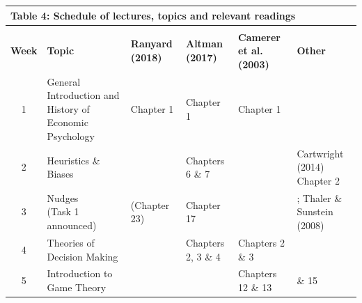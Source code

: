 \documentclass[
  x11names]{article}
\begin{document}
\begin{table}[h!]
  \begin{center}
    \begin{tabular}{| c | >{\arraybackslash}m{5cm} | >{\centering\arraybackslash}m{1.75cm} | >{\centering\arraybackslash}m{1.75cm} | >{\centering\arraybackslash}m{1.75cm} | >{\centering\arraybackslash}m{3cm} | }
    \multicolumn{6}{l}{\textbf{Table 4:} Schedule of lectures, topics and relevant readings} \\
    \hline
    & & \multicolumn{4}{c|}{\textbf{Readings}} \\ \hline
    \textbf{Week} & \textbf{Topic} &                      \textbf{Ranyard (2018)} & \textbf{Altman (2017)} & \textbf{Camerer et al. (2003)} & \textbf{Other}  \\ \hline
      1   & General Introduction and History of Economic Psychology & Chapter 1    & Chapter 1          & Chapter 1           &  \href{https://learn.ul.ie//content/enforced/46950-PS4168_SEM1_2024_5/1.Resources/Cartwright_2014_Chapter1.pdf}{\color{blue}{Cartwright (2014) Chapter 1}\color{black}} \\ \hline
      2   & Heuristics \& Biases                                    & \href{https://learn.ul.ie//content/enforced/46950-PS4168_SEM1_2024_5/1.Resources/Ranyard_2018_Chapter2.pdf}{\color{blue}{Chapter 2}\color{black}}    & Chapters 6 \& 7    &                     & Cartwright (2014) Chapter 2     \\ \hline
      3   & \makecell[l]{Nudges \\ (Task 1 announced) }           & (Chapter 23) & Chapter 17         &                     & \href{https://learn.ul.ie//content/enforced/46950-PS4168_SEM1_2024_5/1.Resources/Frantz_2016_Chapter8.pdf}{\color{blue}{Frantz et al., (2016) Chapter 8}\color{black}}; Thaler \& Sunstein (2008) \\ \hline
      4   & Theories of Decision Making                  & \href{https://learn.ul.ie//content/enforced/46950-PS4168_SEM1_2024_5/1.Resources/Ranyard_2018_Chapter2.pdf}{\color{blue}{Chapter 2}\color{black}}    & Chapters 2, 3 \& 4 & Chapters 2 \& 3     &                                 \\ \hline
      5   & Introduction to Game Theory            &              & \href{https://learn.ul.ie//content/enforced/46950-PS4168_SEM1_2024_5/1.Resources/Altman_2017_Chapter32.pdf}{\color{blue}{Chapter 32}\color{black}}         & Chapters 12 \& 13   & \href{https://learn.ul.ie//content/enforced/46950-PS4168_SEM1_2024_5/1.Resources/Antonides_1996_Chapter14.pdf}{\color{blue}{Antonides, (1996) Chapters 14}\color{black}}   \& 15 \\ \hline

\end{tabular}
\end{center}
\end{table}
\end{document}
